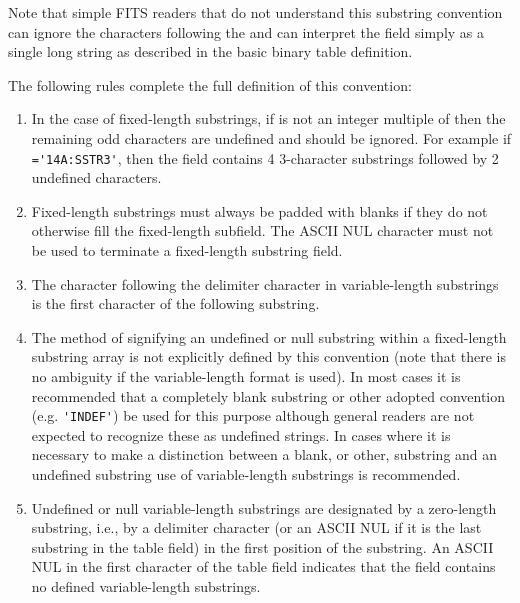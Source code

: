 Note that simple FITS readers that do not understand this substring
convention can ignore the  characters following the
 and can interpret the field simply as a single long string
as described in the basic binary table definition.

The following rules complete the full definition of this convention:
\begin{enumerate}

\item In the case of fixed-length substrings, if  is not an
integer multiple of  then the remaining odd characters are
undefined and should be ignored.  For example if
\verb|='14A:SSTR3'|, then the field contains 4
3-character substrings followed by 2 undefined characters.

\item  Fixed-length substrings must always be padded with blanks if 
they do not otherwise fill the fixed-length subfield.  The ASCII NUL
character must not be used to terminate a fixed-length substring
field.

\item The character following the  delimiter character in
variable-length substrings is the first character of the following
substring.


\item The method of signifying an undefined or null substring within a 
fixed-length substring array is not explicitly defined by this
convention (note that there is no ambiguity if the variable-length
format is used).  In most cases it is recommended that a completely
blank substring or other adopted convention (e.g. \verb|'INDEF'|) be
used for this purpose although general readers are not expected to
recognize these as undefined strings.  In cases where it is necessary
to make a distinction between a blank, or other, substring and an
undefined substring use of variable-length substrings is recommended.


\item Undefined or null variable-length substrings are designated by a 
zero-length substring, i.e., by a delimiter character (or an ASCII NUL
if it is the last substring in the table field) in the first position
of the substring.  An ASCII NUL in the first character of the table
field indicates that the field contains no defined variable-length
substrings.


\end{enumerate}
